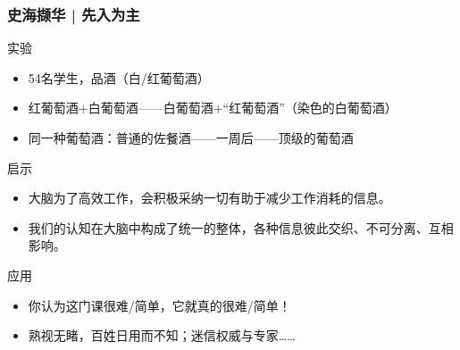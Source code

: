 \begin{frame}
  \frametitle{史海撷华 | 先入为主}
  \begin{block}{实验}
    \begin{itemize}
      \item 54名学生，品酒（白/红葡萄酒）
      \item 红葡萄酒+白葡萄酒——白葡萄酒+“红葡萄酒”（染色的白葡萄酒）
      \item 同一种葡萄酒：普通的佐餐酒——一周后——顶级的葡萄酒
    \end{itemize}
  \end{block}
  \pause
  \begin{block}{启示}
    \begin{itemize}
      \item 大脑为了高效工作，会积极采纳一切有助于减少工作消耗的信息。
      \item 我们的认知在大脑中构成了统一的整体，各种信息彼此交织、不可分离、互相影响。
    \end{itemize}
  \end{block}
  \pause
  \begin{block}{应用}
    \begin{itemize}
      \item 你认为这门课很难/简单，它就真的很难/简单！
      \item 熟视无睹，百姓日用而不知；迷信权威与专家……
    \end{itemize}
  \end{block}
\end{frame}

